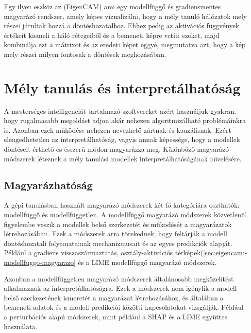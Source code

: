 \documentclass[12pt,oneside,a4paper]{article}
\newcommand{\newsection}[1]{\clearpage\section{#1}}\label{makro}
\theoremstyle{remark}
\begin{document}
	Egy ilyen eszköz az  (\gls{EigenCAM}) ami egy modellfüggő és gradiensmentes magyarázó rendszer,
	amely képes vizualizálni, hogy a mély tanuló hálózatok mely részei járultak hozzá a döntéshozatalhoz.
	Ehhez pedig
	az aktivációs függvények értékeit kiemeli a háló rétegeiből és a bemeneti képre vetíti ezeket, majd kombinálja
	ezt a mátrixot és az eredeti képet eggyé, megmutatva azt, hogy a kép mely részei milyen fontosak a döntések meghozásában.
	
	\newsection{Mély tanulás és interpretálhatóság}\label{sec:mely-tanulas-es-interpretalhatosag}
	A mesterséges intelligenciát tartalmazó szoftvereket azért használjuk gyakran, hogy rugalmasabb megoldást adjon akár
	nehezen algoritmizálható problémáinkra is.
	Azonban ezek működése nehezen nevezhető zártnak és kauzálisnak.
	Ezért elengedhetetlen az interpretálhatóság, vagyis annak képessége, hogy a modellek
	döntéseit érthető és ésszerű módon magyarázza meg.
	Különböző magyarázó módszerek léteznek a mély tanulási modellek interpretálhatóságának növelésére.
	
	\subsection{Magyarázhatóság}\label{subsec:magyarazhatosag}
	A gépi tanulásban használt magyarázó módszerek két fő kategóriára oszthatók: modellfüggő és modellfüggetlen.
	A modellfüggő magyarázó módszerek közvetlenül figyelembe veszik a modellek belső szerkezetét és működését a magyarázatok
	létrehozásában.
	Ezek a módszerek arra törekednek, hogy feltárják a modell döntéshozatali folyamatainak mechanizmusait és az
	egyes predikciók alapját.
	Például a gradiens visszaszármaztatás, osztály-aktivációs térképek(\ref{sec:eigencam:-modellfuggo-magyarazo}\label{sechiv}
	és a LIME modellfüggő magyarázó módszerek.
	
	Azonban a modellfüggetlen magyarázó módszerek általánosabb megközelítést alkalmaznak az interpretálhatóságra.
	Ezek a módszerek nem igénylik a modell belső szerkezetének ismeretét a magyarázat létrehozásához, és általában
	a bemeneti adatok és a modell predikciói közötti kapcsolatokat vizsgálják.
	Például a perturbációs alapú módszerek, mint például a SHAP és a LIME együttes használata.
	
\end{document}
